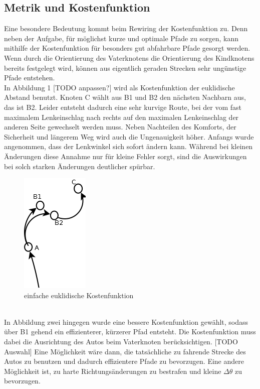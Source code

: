 \subsection{Metrik und Kostenfunktion}
Eine besondere Bedeutung kommt beim Rewiring der Kostenfunktion zu. Denn neben der Aufgabe, für möglichst kurze und optimale Pfade zu sorgen, kann mithilfe der Kostenfunktion für besonders gut abfahrbare Pfade gesorgt werden. \\
Wenn durch die Orientierung des Vaterknotens die Orientierung des Kindknotens bereits festgelegt wird, können aus eigentlich geraden Strecken sehr ungünstige Pfade entstehen.\\
 In Abbildung 1 [TODO anpassen?] wird als Kostenfunktion der euklidische Abstand benutzt. Knoten C wählt aus B1 und B2 den nächsten Nachbarn aus, das ist B2. Leider entsteht dadurch eine sehr kurvige Route, bei der vom fast maximalem Lenkeinschlag nach rechts auf den maximalen Lenkeinschlag der anderen Seite gewechselt werden muss. Neben Nachteilen des Komforts, der Sicherheit und längerem Weg wird auch die Ungenauigkeit höher. Anfangs wurde angenommen, dass der Lenkwinkel sich sofort ändern kann. Während bei kleinen Änderungen diese Annahme nur für kleine Fehler sorgt, sind die Auswirkungen bei solch starken Änderungen deutlicher spürbar.
\begin{figure}
\centering
 \includegraphics[scale=1]{Bilder/B2Insert.png}
 \caption{einfache euklidische Kostenfunktion}
 \label{fig1}
\end{figure}	\\
In Abbildung zwei hingegen wurde eine bessere Kostenfunktion gewählt, sodass über B1 gehend ein effizienterer, kürzerer Pfad entsteht. Die Kostenfunktion muss dabei die Ausrichtung des Autos beim Vaterknoten berücksichtigen. [TODO Auswahl] Eine Möglichkeit wäre dann, die tatsächliche zu fahrende Strecke des Autos zu benutzen und dadurch effizientere Pfade zu bevorzugen. Eine andere Möglichkeit ist, zu harte Richtungsänderungen zu bestrafen und kleine $ \Delta \theta$ zu bevorzugen. 
